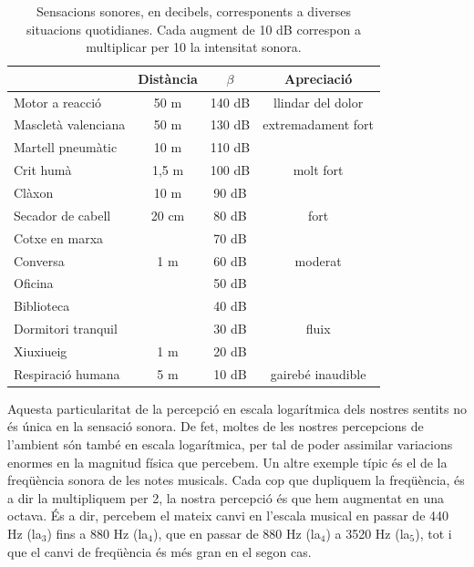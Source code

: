 \documentclass[12pt]{book}
\begin{document}
\begin{table}[H]
    \centering
    \begin{tabular}{|l|c|c|c|}
    \hline
                          & Distància & $\beta$ & Apreciació  \\ \hline
        Motor a reacció     & 50 m  & 140 dB & llindar del dolor \\ \hline
        Mascletà valenciana & 50 m  & 130 dB & extremadament fort \\ \hline
        Martell pneumàtic   & 10 m  & 110 dB &  \\ \hline
        Crit humà           & 1,5 m & 100 dB & molt fort \\ \hline
        Clàxon              & 10 m  & 90 dB  &  \\ \hline
        Secador de cabell   & 20 cm & 80 dB  & fort \\ \hline
        Cotxe en marxa      &       & 70 dB  &  \\ \hline
        Conversa            & 1 m   & 60 dB  & moderat \\ \hline
        Oficina             &       & 50 dB  &  \\ \hline
        Biblioteca          &       & 40 dB  &  \\ \hline
        Dormitori tranquil  &       & 30 dB  & fluix \\ \hline
        Xiuxiueig           & 1 m   & 20 dB  &  \\ \hline
        Respiració humana   & 5 m   & 10 dB  & gairebé inaudible \\ \hline
    \end{tabular}
    \caption{Sensacions sonores, en decibels, corresponents a diverses situacions quotidianes. Cada augment de 10 dB correspon a multiplicar per 10 la intensitat sonora.}
    \label{tab:TaulaSensacionsSonores}
\end{table}
%
Aquesta particularitat de la percepció en escala logarítmica dels nostres sentits no és única en la sensació sonora. De fet, moltes de les nostres percepcions de l'ambient són també en escala logarítmica, per tal de poder assimilar variacions enormes en la magnitud física que percebem. Un altre exemple típic és el de la freqüència sonora de les notes musicals. Cada cop que dupliquem la freqüència, és a dir la multipliquem per 2, la nostra percepció és que hem augmentat en una octava. És a dir, percebem el mateix canvi en l'escala musical en passar de 440 Hz (la$_3$) fins a 880 Hz (la$_4$), que en passar de 880 Hz (la$_4$) a 3520 Hz (la$_5$), tot i que el canvi de freqüència és més gran en el segon cas.
\end{document}
